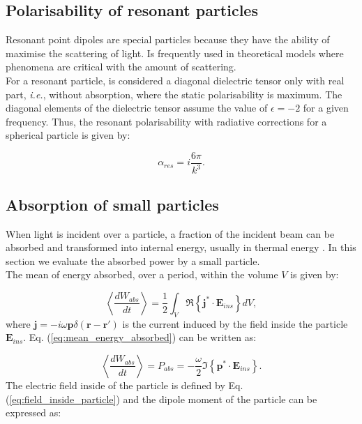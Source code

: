 \subsection{Polarisability of resonant particles\label{sec:chap2_resonant}}

Resonant point dipoles are special particles because they have the ability of maximise the scattering of light. Is frequently used in theoretical models where phenomena are critical with the amount of scattering.\\
For a resonant particle, is considered a diagonal dielectric tensor only with real part, \textit{i.e.}, without absorption, where the static polarisability is maximum. The diagonal elements of the dielectric tensor assume the value of $\epsilon = -2$ for a given frequency. Thus, the resonant polarisability with radiative corrections for a spherical particle is given by:

\begin{equation}
\alpha_{res} = i\frac{6\pi}{k^3}.
\end{equation}

\subsection{Absorption of small particles\label{sec:chap2_abs_small_part}}

When light is incident over a particle, a fraction of the incident beam can be absorbed and transformed into internal energy, usually in thermal energy \cite{Baffou_2009}.
In this section we evaluate the absorbed power by a small particle.\\
The mean of energy absorbed, over a period, within the volume $V$ is given by:

\begin{equation}
\left<\frac{dW_{abs}}{dt}\right>=\frac{1}{2}\int_{V}\Re\left\{\mathbf{j}^{*}\cdot\mathbf{E}_{ins}\right\}dV,\label{eq:mean_energy_absorbed}
\end{equation}
where $\mathbf{j}=-i\omega \mathbf{p}\delta\left(\mathbf{r}-\mathbf{r}'\right)$ is the current induced by the field inside the particle $\mathbf{E}_{ins}$. Eq. (\ref{eq:mean_energy_absorbed}) can be written as:

\begin{equation}
\left<\frac{dW_{abs}}{dt}\right>=P_{abs}=-\frac{\omega}{2} \Im\left\{\mathbf{p}^{*}\cdot\mathbf{E}_{ins}\right\}.
\end{equation}
The electric field inside of the particle is defined by Eq. (\ref{eq:field_inside_particle}) and the dipole moment of the particle can be expressed as:


